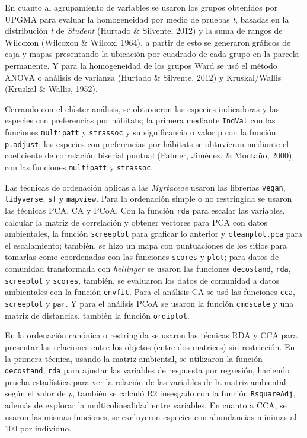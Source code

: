 \documentclass[11pt,]{article}
\begin{document}
En cuanto al agrupamiento de variables se usaron los grupos obtenidos
por UPGMA para evaluar la homogeneidad por medio de pruebas \emph{t},
basadas en la distribución \emph{t} de \emph{Student} (Hurtado \&
Silvente, 2012) y la suma de rangos de Wilcoxon (Wilcoxon \& Wilcox,
1964), a partir de esto se generaron gráficos de caja y mapas
presentando la ubicación por cuadrado de cada grupo en la parcela
permanente. Y para la homogeneidad de los grupos Ward se usó el método
ANOVA o análisis de varianza (Hurtado \& Silvente, 2012) y
Kruskal/Wallis (Kruskal \& Wallis, 1952).

Cerrando con el clúster análisis, se obtuvieron las especies indicadoras
y las especies con preferencias por hábitats; la primera mediante
\texttt{IndVal} con las funciones \texttt{multipatt} y \texttt{strassoc}
y su significancia o valor p con la función \texttt{p.adjust}; las
especies con preferencias por hábitats se obtuvieron mediante el
coeficiente de correlación biserial puntual (Palmer, Jiménez, \&
Montaño, 2000) con las funciones \texttt{multipatt} y \texttt{strassoc}.

Las técnicas de ordenación aplicas a las \emph{Myrtaceae} usaron las
librerías \texttt{vegan}, \texttt{tidyverse}, \texttt{sf} y
\texttt{mapview}. Para la ordenación simple o no restringida se usaron
las técnicas PCA, CA y PCoA. Con la función \texttt{rda} para escalar
las variables, calcular la matriz de correlación y obtener vectores para
PCA con datos ambientales, la función \texttt{screeplot} para graficar
lo anterior y \texttt{cleanplot.pca} para el escalamiento; también, se
hizo un mapa con puntuaciones de los sitios para tomarlas como
coordenadas con las funciones \texttt{scores} y \texttt{plot}; para
datos de comunidad transformada con \emph{hellinger} se usaron las
funciones \texttt{decostand}, \texttt{rda}, \texttt{screeplot} y
\texttt{scores}, también, se evaluaron los datos de comunidad a datos
ambientales con la función \texttt{envfit}. Para el análisis CA se usó
las funciones \texttt{cca}, \texttt{screeplot} y \texttt{par}. Y para el
análisis PCoA se usaron la función \texttt{cmdscale} y una matriz de
distancias, también la función \texttt{ordiplot}.

En la ordenación canónica o restringida se usaron las técnicas RDA y CCA
para presentar las relaciones entre los objetos (entre dos matrices) sin
restricción. En la primera técnica, usando la matriz ambiental, se
utilizaron la función \texttt{decostand}, \texttt{rda} para ajustar las
variables de respuesta por regresión, haciendo prueba estadística para
ver la relación de las variables de la matriz ambiental según el valor
de \emph{p}, también se calculó R2 insesgado con la función
\texttt{RsquareAdj}, además de explorar la multicolinealidad entre
variables. En cuanto a CCA, se usaron las mismas funciones, se
excluyeron especies con abundancias mínimas al 100 por individuo.
\end{document}
